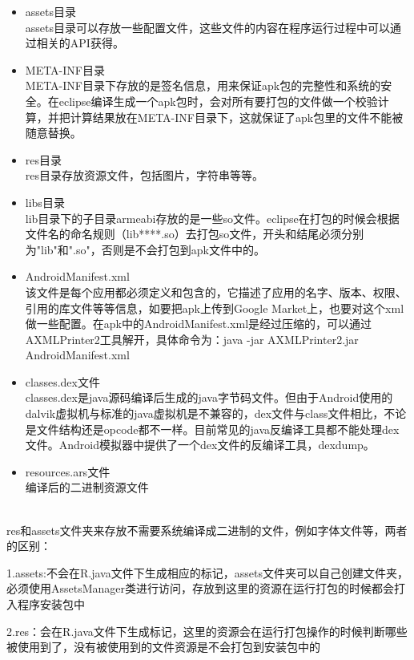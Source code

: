 \begin{itemize}
\item assets目录\\
assets目录可以存放一些配置文件，这些文件的内容在程序运行过程中可以通过相关的API获得。

\item META-INF目录\\
META-INF目录下存放的是签名信息，用来保证apk包的完整性和系统的安全。在eclipse编译生成一个apk包时，会对所有要打包的文件做一个校验计算，并把计算结果放在META-INF目录下，这就保证了apk包里的文件不能被随意替换。

\item res目录\\
res目录存放资源文件，包括图片，字符串等等。

\item libs目录\\
lib目录下的子目录armeabi存放的是一些so文件。eclipse在打包的时候会根据文件名的命名规则（lib****.so）去打包so文件，开头和结尾必须分别为"lib"和".so"，否则是不会打包到apk文件中的。

\item AndroidManifest.xml\\
该文件是每个应用都必须定义和包含的，它描述了应用的名字、版本、权限、引用的库文件等等信息，如要把apk上传到Google Market上，也要对这个xml做一些配置。在apk中的AndroidManifest.xml是经过压缩的，可以通过AXMLPrinter2工具解开，具体命令为：java -jar AXMLPrinter2.jar AndroidManifest.xml

\item classes.dex文件\\
 classes.dex是java源码编译后生成的java字节码文件。但由于Android使用的dalvik虚拟机与标准的java虚拟机是不兼容的，dex文件与class文件相比，不论是文件结构还是opcode都不一样。目前常见的java反编译工具都不能处理dex文件。Android模拟器中提供了一个dex文件的反编译工具，dexdump。

\item resources.ars文件\\
编译后的二进制资源文件
\end{itemize}

\\
res和assets文件夹来存放不需要系统编译成二进制的文件，例如字体文件等，两者的区别：

1.assets:不会在R.java文件下生成相应的标记，assets文件夹可以自己创建文件夹，必须使用AssetsManager类进行访问，存放到这里的资源在运行打包的时候都会打入程序安装包中

2.res：会在R.java文件下生成标记，这里的资源会在运行打包操作的时候判断哪些被使用到了，没有被使用到的文件资源是不会打包到安装包中的




